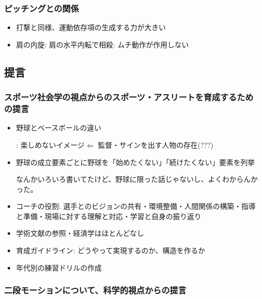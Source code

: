 \documentclass[dvipdfmx, 10.5pt]{jsarticle}
\begin{document}
\subsubsection{ピッチングとの関係}

\begin{itemize}
  \item 打撃と同様、運動依存項の生成する力が大きい

  \item 肩の内旋: 肩の水平内転で相殺: ムチ動作が作用しない
\end{itemize}

\subsection{提言}

\subsubsection{スポーツ社会学の視点からのスポーツ・アスリートを育成するための提言}

\begin{itemize}
  \item 野球とベースボールの違い

  : 楽しめないイメージ$\Leftarrow$ 監督・サインを出す人物の存在(???)

  \item 野球の成立要素ごとに野球を「始めたくない」「続けたくない」要素を列挙

  なんかいろいろ書いてたけど、野球に限った話じゃないし、よくわからんかった。

  \item コーチの役割: 選手とのビジョンの共有・環境整備・人間関係の構築・指導と準備・現場に対する理解と対応・学習と自身の振り返り

  \item 学術文献の参照・経済学はほとんどなし

  \item 育成ガイドライン: どうやって実現するのか、構造を作るか

  \item 年代別の練習ドリルの作成
\end{itemize}

\subsubsection{二段モーションについて、科学的視点からの提言}
\end{document}
